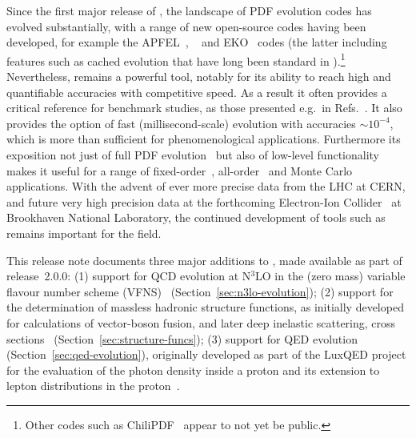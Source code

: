 \documentclass[preprint,1p,a4paper,11pt]{elsarticle}
\begin{document}
Since the first major release of \hoppet, the landscape of PDF
evolution codes has evolved substantially, with a range of new open-source
codes having been developed, for example the APFEL~\cite{Bertone:2013vaa}, \APFELPP{}~\cite{Bertone:2017gds} and EKO~\cite{Candido:2022tld}
codes (the latter including
features such as cached evolution that have long been standard in
\hoppet).\footnote{Other codes such as ChiliPDF~\cite{Diehl:2021gvs}
  appear to not yet be public.}
%
Nevertheless, \hoppet remains a powerful tool, notably for its ability
to reach high and quantifiable accuracies with competitive speed.
%
As a result it often provides a critical reference for benchmark
studies, as those presented e.g.\ in
Refs.~\cite{Dittmar:2005ed,Bertone:2024dpm}.
%
It also provides the option of fast (millisecond-scale) evolution with
accuracies $\sim 10^{-4}$, which is more than sufficient for
phenomenological applications.
%
%
Furthermore its exposition not just of full PDF
evolution~\cite{Lai:2010vv,Gao:2013xoa,Butterworth:2015oua,PDF4LHCWorkingGroup:2022cjn}
but also of low-level functionality makes it useful for a range of
fixed-order~\cite{Caola:2019nzf,Asteriadis:2019dte,Bargiela:2022dla},
all-order~\cite{Banfi:2010xy,Dasgupta:2014yra,Banfi:2015pju,Monni:2016ktx,Bizon:2017rah,Buonocore:2024xmy}
and Monte
Carlo~\cite{Monni:2019whf,vanBeekveld:2023ivn,Buonocore:2024pdv,vanBeekveld:2025lpz}
applications.
%
With the advent of ever more precise data from the LHC at CERN, and
future very high precision data at the forthcoming Electron-Ion
Collider~\cite{AbdulKhalek:2021gbh} at Brookhaven National Laboratory,
the continued development of tools such as \hoppet remains important
for the field.

This release note documents three major additions to \hoppet, made
available as part of release~2.0.0: 
%
(1) support for QCD evolution at N$^3$LO in the (zero mass) variable
flavour number scheme (VFNS)~\cite{Buza:1996wv} (Section~\ref{sec:n3lo-evolution});
%
(2) support for the
determination of massless hadronic structure functions, as initially developed
for calculations of vector-boson fusion, and later deep inelastic scattering, cross
sections~\cite{Cacciari:2015jma,Dreyer:2016oyx,Dreyer:2018qbw,Dreyer:2018rfu,Karlberg:2024hnl}
(Section~\ref{sec:structure-funcs});
%
(3) support for QED evolution (Section~\ref{sec:qed-evolution}),
originally developed as part of the LuxQED project for the evaluation
of the photon density inside a proton and its extension to lepton
distributions in the
proton~\cite{Manohar:2016nzj,Manohar:2017eqh,Buonocore:2020nai,Buonocore:2021bsf}.
\end{document}
